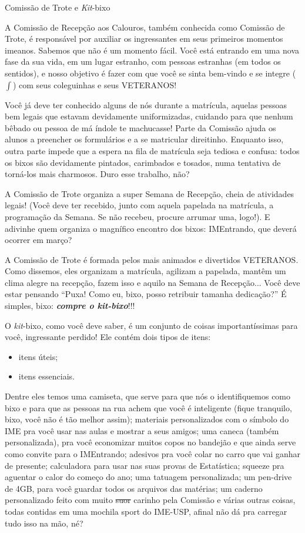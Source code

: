 \begin{secao}{Comissão de Trote e \textit{Kit}-bixo}

A Comissão de Recepção aos Calouros, também conhecida como Comissão de Trote,
é responsável por auxiliar os ingressantes em seus primeiros momentos imeanos.
Sabemos que não é um momento fácil. Você está entrando em uma nova fase da
sua vida, em um lugar estranho, com pessoas estranhas (em todos os sentidos), e
nosso objetivo é fazer com que você se sinta bem-vindo e se integre ($\int$)
com seus coleguinhas e seus VETERANOS!

Você já deve ter conhecido alguns de nós durante a matrícula, aquelas pessoas
bem legais que estavam devidamente uniformizadas, cuidando para que nenhum
bêbado ou pessoa de má índole te machucasse! Parte da Comissão ajuda os
alunos a preencher os formulários e a se matricular direitinho. Enquanto isso,
outra parte impede que a espera na fila de matrícula seja tediosa e confusa:
todos os bixos são devidamente pintados, carimbados e tosados, numa tentativa
de torná-los mais charmosos. Duro esse trabalho, não?

A Comissão de Trote organiza a super Semana de Recepção, cheia de atividades
legais! (Você deve ter recebido, junto com aquela papelada na matrícula, a
programação da Semana. Se não recebeu, procure arrumar uma, logo!).
E adivinhe quem organiza o magnífico encontro dos bixos: IMEntrando, que deverá
ocorrer em março? %

A Comissão de Trote é formada pelos mais animados e divertidos VETERANOS. Como
dissemos, eles organizam a matrícula, agilizam a papelada, mantêm um clima
alegre na recepção, fazem isso e aquilo na Semana de Recepção...
Você deve estar pensando ``Puxa! Como eu, bixo, posso retribuir
tamanha dedicação?'' É simples, bixo: {\bf\em compre o \textit{kit}-bixo}!!!

O \textit{kit}-bixo, como você deve saber, é um conjunto de coisas importantíssimas
para você, ingressante perdido! Ele contém dois tipos de itens:
\begin{itemize}
\item itens úteis;
\item itens essenciais.
\end{itemize} %
Dentre eles temos uma camiseta, que serve para que
nós o identifiquemos como bixo e para que as pessoas na rua achem que você é
inteligente (fique tranquilo, bixo, você não é tão melhor assim);
materiais personalizados com o símbolo do IME pra você usar nas aulas e mostrar a seus amigos;
uma caneca (também personalizada), pra você economizar muitos copos no bandejão
e que ainda serve como convite para o IMEntrando;
adesivos pra você colar no carro que vai ganhar de presente;
calculadora para usar nas suas provas de Estatística;
squeeze pra aguentar o calor do começo do ano;
uma tatuagem personalizada;
um pen-drive de 4GB, para você guardar todos os arquivos das matérias;
um caderno personalizado feito com muito \sout{suor} carinho pela Comissão e
várias outras coisas, todas contidas em uma mochila sport do IME-USP, afinal
não dá pra carregar tudo isso na mão, né?


\end{secao}
